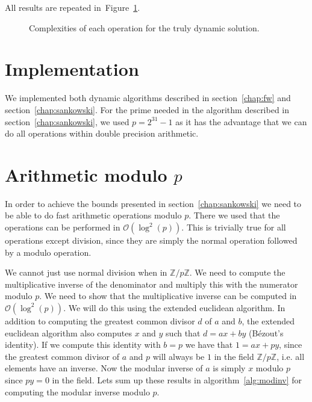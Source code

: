 \documentclass[a4paper,oneside,article,11pt]{memoir}
\begin{document}
All results are repeated in~Figure~\ref{fig:truly-comp}.

\begin{figure}[h]
\caption{Complexities of each operation for the truly dynamic solution.}
\label{fig:truly-comp}
\end{figure}

\chapter{Implementation}
\label{impl}

We implemented both dynamic algorithms described in section~\ref{chap:fw} and section~\ref{chap:sankowski}. For the prime needed in the algorithm described in section~\ref{chap:sankowski}, we used $p = 2^{31}-1$ as it has the advantage that we can do all operations within double precision arithmetic.



\chapter{Arithmetic modulo $p$}
\label{chap:prime}
In order to achieve the bounds presented in section~\ref{chap:sankowski} we need to be able to do fast arithmetic operations modulo $p$. There we used that the operations can be performed in $\mathcal{O}(\log^2(p))$. This is trivially true for all operations except division, since they are simply the normal operation followed by a modulo operation.

We cannot just use normal division when in $\mathbb{Z}/p\mathbb{Z}$. We need to compute the multiplicative inverse of the denominator and multiply this with the numerator modulo $p$. We need to show that the multiplicative inverse can be computed in $\mathcal{O}(\log^2(p))$. We will do this using the extended euclidean algorithm. In addition to computing the greatest common divisor $d$ of $a$ and $b$, the extended euclidean algorithm also computes $x$ and $y$ such that $d = ax+by$ (Bézout's identity). If we compute this identity with $b = p$ we have that $1 = ax+py$, since the greatest common divisor of $a$ and $p$ will always be $1$ in the field $\mathbb{Z}/p\mathbb{Z}$, i.e. all elements have an inverse. Now the modular inverse of $a$ is simply $x$ modulo $p$ since $py = 0$ in the field. Lets sum up these results in algorithm~\ref{alg:modinv} for computing the modular inverse modulo $p$.
\end{document}
